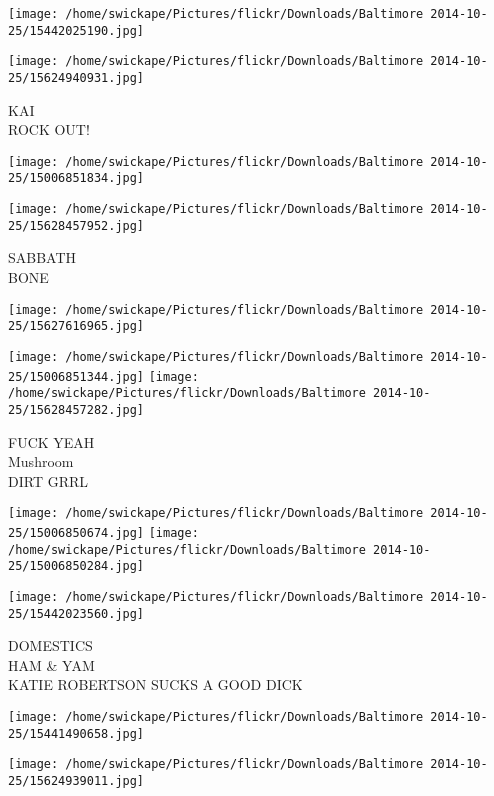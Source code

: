 \documentclass[10pt,letterpaper]{article}
\begin{document}
\texttt{[image: /home/swickape/Pictures/flickr/Downloads/Baltimore 2014-10-25/15442025190.jpg]}

\vspace{0.25in}
\texttt{[image: /home/swickape/Pictures/flickr/Downloads/Baltimore 2014-10-25/15624940931.jpg]}

KAI\\
ROCK OUT!\\
\pagebreak

\texttt{[image: /home/swickape/Pictures/flickr/Downloads/Baltimore 2014-10-25/15006851834.jpg]}

\vspace{0.25in}
\texttt{[image: /home/swickape/Pictures/flickr/Downloads/Baltimore 2014-10-25/15628457952.jpg]}

SABBATH\\
BONE\\
\pagebreak

\texttt{[image: /home/swickape/Pictures/flickr/Downloads/Baltimore 2014-10-25/15627616965.jpg]}

\vspace{0.25in}
\texttt{[image: /home/swickape/Pictures/flickr/Downloads/Baltimore 2014-10-25/15006851344.jpg]}
\texttt{[image: /home/swickape/Pictures/flickr/Downloads/Baltimore 2014-10-25/15628457282.jpg]}

FUCK YEAH\\
Mushroom\\
DIRT GRRL\\
\pagebreak

\texttt{[image: /home/swickape/Pictures/flickr/Downloads/Baltimore 2014-10-25/15006850674.jpg]}
\texttt{[image: /home/swickape/Pictures/flickr/Downloads/Baltimore 2014-10-25/15006850284.jpg]}

\vspace{0.25in}
\texttt{[image: /home/swickape/Pictures/flickr/Downloads/Baltimore 2014-10-25/15442023560.jpg]}

DOMESTICS\\
HAM \& YAM\\
KATIE ROBERTSON SUCKS A GOOD DICK\\
\pagebreak

\texttt{[image: /home/swickape/Pictures/flickr/Downloads/Baltimore 2014-10-25/15441490658.jpg]}

\vspace{0.25in}
\texttt{[image: /home/swickape/Pictures/flickr/Downloads/Baltimore 2014-10-25/15624939011.jpg]}
\end{document}
